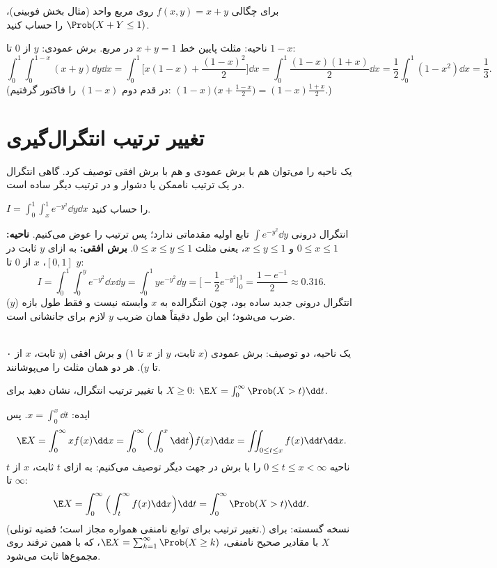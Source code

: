 \begin{example}[احتمال $X+Y\le1$]
برای چگالی $f(x,y)=x+y$ روی مربع واحد (مثال بخش فوبینی)، $\Prob(X+Y\le1)$ را حساب کنید.
\begin{solution}
ناحیه: مثلث پایین خط $x+y=1$ در مربع. برش عمودی: $y$ از $0$ تا $1-x$:
\[
\int_0^1\!\!\int_0^{1-x}(x+y)\dd y\dd x=\int_0^1\Big[x(1-x)+\frac{(1-x)^2}{2}\Big]\dd x=\int_0^1\frac{(1-x)(1+x)}{2}\dd x=\frac12\int_0^1(1-x^2)\dd x=\frac13 .
\]
(در قدم دوم $(1-x)$ را فاکتور گرفتیم: $(1-x)\big(x+\frac{1-x}{2}\big)=(1-x)\frac{1+x}{2}$.)
\end{solution}
\end{example}

\section{تغییر ترتیب انتگرال‌گیری}
یک ناحیه را می‌توان هم با برش عمودی و هم با برش افقی توصیف کرد. گاهی انتگرال در یک ترتیب ناممکن یا دشوار و در ترتیب دیگر ساده است.

\begin{example}
$I=\int_0^1\int_x^1e^{-y^2}\dd y\dd x$ را حساب کنید.
\begin{solution}
انتگرال درونی $\int e^{-y^2}\dd y$ تابع اولیه مقدماتی ندارد؛ پس ترتیب را عوض می‌کنیم. \textbf{ناحیه:} $0\le x\le1$ و $x\le y\le1$، یعنی مثلث $0\le x\le y\le1$. \textbf{برش افقی:} به ازای $y$ ثابت در $[0,1]$، $x$ از $0$ تا $y$:
\[
I=\int_0^1\!\!\int_0^ye^{-y^2}\dd x\dd y=\int_0^1ye^{-y^2}\dd y=\Big[-\frac12e^{-y^2}\Big]_0^1=\frac{1-e^{-1}}{2}\approx0.316 .
\]
انتگرال درونی جدید ساده بود، چون انتگرالده به $x$ وابسته نیست و فقط طول بازه ($y$) ضرب می‌شود؛ این طول دقیقاً همان ضریب $y$ لازم برای جانشانی است.
\end{solution}
\end{example}

\begin{center}
\begin{tikzpicture}
\end{tikzpicture}\\
{\small یک ناحیه، دو توصیف: برش عمودی ($x$ ثابت، $y$ از $x$ تا ۱) و برش افقی ($y$ ثابت، $x$ از ۰ تا $y$). هر دو همان مثلث را می‌پوشانند.}
\end{center}

\begin{example}
با تغییر ترتیب انتگرال، نشان دهید برای $X\ge0$: $\E X=\int_0^\infty\Prob(X>t)\dd t$.
\begin{solution}
ایده: $x=\int_0^x\dd t$. پس
\[
\E X=\int_0^\infty xf(x)\dd x=\int_0^\infty\Big(\int_0^x\dd t\Big)f(x)\dd x=\iint_{0\le t\le x}f(x)\dd t\dd x .
\]
ناحیه $0\le t\le x<\infty$ را با برش در جهت دیگر توصیف می‌کنیم: به ازای $t$ ثابت، $x$ از $t$ تا $\infty$:
\[
\E X=\int_0^\infty\Big(\int_t^\infty f(x)\dd x\Big)\dd t=\int_0^\infty\Prob(X>t)\dd t .
\]
(تغییر ترتیب برای توابع نامنفی همواره مجاز است؛ قضیه تونلی.) نسخه گسسته: برای $X$ با مقادیر صحیح نامنفی، $\E X=\sum_{k=1}^\infty\Prob(X\ge k)$، که با همین ترفند روی مجموع‌ها ثابت می‌شود.
\end{solution}
\end{example}

